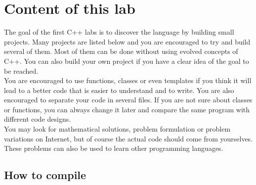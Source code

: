 \documentclass{ecnreport}
\begin{document}


\newcommand{\involves}[1]{
\item {\bf C++ skills:} #1
}

\newcommand{\aitip}[1]{
\item {\bf AI tips:} #1
}


\section{Content of this lab}

The goal of the first C++ labs is to discover the language by building small projects.
Many projects are listed below and you are encouraged to try and build several of them. Most of them can be done without using evolved concepts of C++. You can also build your own project if you have a clear idea of the goal to be reached.\\

You are encouraged to use functions, classes or even templates if you think it will lead to a better code that is easier to understand and to write.
You are also encouraged to separate your code in several files. If you are not sure about classes or functions, you can always change it later and compare
the same program with different code designs.\\

You may look for mathematical solutions, problem formulation or problem variations on Internet, but of course the actual code should come from yourselves. \\

These problems can also be used to learn other programming languages.

\subsection{How to compile}
\end{document}

